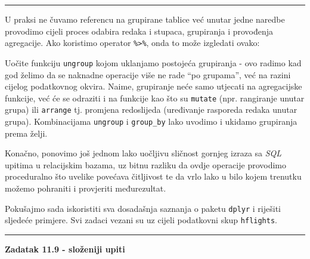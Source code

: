 \documentclass[]{book}
\newenvironment{Shaded}{\begin{snugshade}}{\end{snugshade}}
\newcommand{\KeywordTok}[1]{\textcolor[rgb]{0.13,0.29,0.53}{\textbf{#1}}}
\newcommand{\DecValTok}[1]{\textcolor[rgb]{0.00,0.00,0.81}{#1}}
\newcommand{\StringTok}[1]{\textcolor[rgb]{0.31,0.60,0.02}{#1}}
\newcommand{\OperatorTok}[1]{\textcolor[rgb]{0.81,0.36,0.00}{\textbf{#1}}}
\newcommand{\NormalTok}[1]{#1}
\theoremstyle{definition}
\theoremstyle{definition}
\theoremstyle{definition}
\theoremstyle{remark}
\begin{document}
\begin{center}\rule{0.5\linewidth}{\linethickness}\end{center}

U praksi ne čuvamo referencu na grupirane tablice već unutar jedne
naredbe provodimo cijeli proces odabira redaka i stupaca, grupiranja i
provođenja agregacije. Ako koristimo operator
\texttt{\%\textgreater{}\%}, onda to može izgledati ovako:

\begin{Shaded}
\end{Shaded}

Uočite funkciju \texttt{ungroup} kojom uklanjamo postojeća grupiranja -
ovo radimo kad god želimo da se naknadne operacije više ne rade ``po
grupama'', već na razini cijelog podatkovnog okvira. Naime, grupiranje
neće samo utjecati na agregacijske funkcije, već će se odraziti i na
funkcije kao što su \texttt{mutate} (npr. rangiranje unutar grupa) ili
\texttt{arrange} tj. promjena redoslijeda (uređivanje rasporeda redaka
unutar grupa). Kombinacijama \texttt{ungroup} i \texttt{group\_by} lako
uvodimo i ukidamo grupiranja prema želji.

Konačno, ponovimo još jednom lako uočljivu sličnost gornjeg izraza sa
\emph{SQL} upitima u relacijskim bazama, uz bitnu razliku da ovdje
operacije provodimo proceduralno što uvelike povećava čitljivost te da
vrlo lako u bilo kojem trenutku možemo pohraniti i provjeriti
međurezultat.

Pokušajmo sada iskoristiti sva dosadašnja saznanja o paketu
\texttt{dplyr} i riješiti sljedeće primjere. Svi zadaci vezani su uz
cijeli podatkovni skup \texttt{hflights}.

\begin{center}\rule{0.5\linewidth}{\linethickness}\end{center}

\textbf{Zadatak 11.9 - složeniji upiti}
\end{document}

